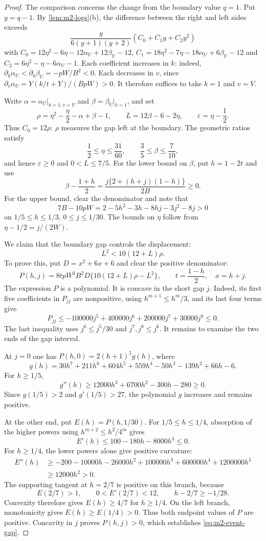 \begin{proof}
The comparison concerns the change from the boundary value $q=1$.
Put $y=q-1$. By \cref{lem:m2-logs}(b), the difference between the right and left sides exceeds
\[
\frac{y}{6(y+1)(y+2)}(C_0+C_1y+C_2y^2)
\]
with $C_0=12\eta^2-6\eta-12\alpha_U+12\beta_U-12$,
$C_1=18\eta^2-7\eta-18\alpha_U+6\beta_U-12$ and $C_2=6\eta^2-\eta-6\alpha_U-1$.
Each coefficient increases in $k$: indeed,
$\partial_k\alpha_U<\partial_k\beta_U=-pW/B^2<0$.
Each decreases in $v$, since $\partial_v\alpha_U=Y(k/t+Y)/(BpW)>0$.
It therefore suffices to take $k=1$ and $v=V$.

Write $\alpha=\alpha_U|_{k=1,v=V}$ and $\beta=\beta_U|_{k=1}$, and set
\[
 \rho=\eta^2-\frac\eta2-\alpha+\beta-1,
 \qquad L=12\beta-6-2\eta,
 \qquad \varepsilon=\eta-\frac12.
\]
Thus $C_0=12\rho$: $\rho$ measures the gap left at the boundary.
The geometric ratios satisfy
\[
 \frac12\le\eta\le\frac{31}{60},\qquad
 \frac35\le\beta\le\frac7{10},
\]
and hence $\varepsilon\ge0$ and $0<L\le7/5$.
For the lower bound on $\beta$, put $h=1-2t$ and use
\[
 \beta-\frac{1+h}{2}
 =\frac{j\{2+(h+j)(1-h)\}}{2B}\ge0.
\]
For the upper bound, clear the denominator and note that
\[
 7B-10pW=2-5h^2-3h-8hj-3j^2-8j>0
\]
on $1/5\le h\le1/3$, $0\le j\le1/30$.
The bounds on $\eta$ follow from $\eta-1/2=j/(2W)$.

We claim that the boundary gap controls the displacement:
\begin{equation}\label{eq:m2-event-gap}
 L^2<10(12+L)\rho.
\end{equation}
To prove this, put $D=x^2+6x+6$ and clear the positive denominator:
\[
 P(h,j)=8tpW^3B^2D\{10(12+L)\rho-L^2\},
 \qquad t=\frac{1-h}{2},\quad x=h+j.
\]
The expression $P$ is a polynomial. It is concave in the short gap $j$.
Indeed, its first five coefficients in $P_{jj}$ are nonpositive, using
$h^{m+1}\le h^m/3$, and its last four terms give
\[
 P_{jj}\le-100000j^5+400000j^6+200000j^7+30000j^8\le0.
\]
The last inequality uses $j^6\le j^5/30$ and $j^7,j^8\le j^6$.
It remains to examine the two ends of the gap interval.

At $j=0$ one has $P(h,0)=2(h+1)^5g(h)$, where
\[
 g(h)=30h^7+211h^6+604h^5+559h^4-50h^3-139h^2+66h-6.
\]
For $h\ge1/5$,
\[
 g''(h)\ge12000h^3+6700h^2-300h-280\ge0.
\]
Since $g(1/5)>2$ and $g'(1/5)>27$, the polynomial $g$ increases and remains positive.

At the other end, put $E(h)=P(h,1/30)$.
For $1/5\le h\le1/4$, absorption of the higher powers using
$h^{m+2}\le h^2/4^m$ gives
\[
 E'(h)\le100-180h-8000h^3\le0.
\]
For $h\ge1/4$, the lower powers alone give positive curvature:
\begin{align*}
 E''(h)&\ge-200-10000h-26000h^2
              +100000h^3+600000h^4+1200000h^5\\
       &\ge12000h^2>0.
\end{align*}
The supporting tangent at $h=2/7$ is positive on this branch, because
\[
 E(2/7)>1,\qquad 0<E'(2/7)<12,
 \qquad h-2/7\ge-1/28.
\]
Convexity therefore gives $E(h)\ge4/7$ for $h\ge1/4$.
On the left branch, monotonicity gives $E(h)\ge E(1/4)>0$.
Thus both endpoint values of $P$ are positive. Concavity in $j$ proves
$P(h,j)>0$, which establishes \eqref{eq:m2-event-gap}.


\end{proof}
